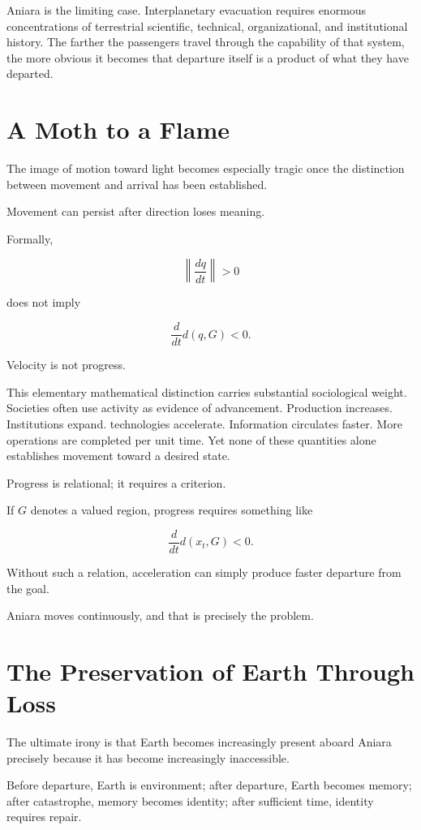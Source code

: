 \documentclass[11pt,oneside]{book}
\theoremstyle{definition}
\theoremstyle{remark}
\begin{document}
Aniara is the limiting case. Interplanetary evacuation requires enormous concentrations of terrestrial scientific, technical, organizational, and institutional history. The farther the passengers travel through the capability of that system, the more obvious it becomes that departure itself is a product of what they have departed.

\section{A Moth to a Flame}

The image of motion toward light becomes especially tragic once the distinction between movement and arrival has been established.

Movement can persist after direction loses meaning.

Formally,

\[
\left\|
\frac{dq}{dt}
\right\|>0
\]

does not imply

\[
\frac{d}{dt}d(q,G)<0.
\]

Velocity is not progress.

This elementary mathematical distinction carries substantial sociological weight. Societies often use activity as evidence of advancement. Production increases. Institutions expand. technologies accelerate. Information circulates faster. More operations are completed per unit time. Yet none of these quantities alone establishes movement toward a desired state.

Progress is relational; it requires a criterion.

If \(G\) denotes a valued region, progress requires something like

\[
\frac{d}{dt}d(x_t,G)<0.
\]

Without such a relation, acceleration can simply produce faster departure from the goal.

Aniara moves continuously, and that is precisely the problem.

\section{The Preservation of Earth Through Loss}

The ultimate irony is that Earth becomes increasingly present aboard Aniara precisely because it has become increasingly inaccessible.

Before departure, Earth is environment; after departure, Earth becomes memory; after catastrophe, memory becomes identity; after sufficient time, identity requires repair.
\end{document}
